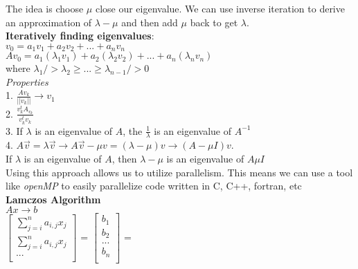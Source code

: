 \documentclass[12pt, AMS Euler]{article}
\begin{document}
The idea is choose $\mu$ close our eigenvalue. We can use inverse iteration to derive an approximation of $\lambda - \mu$ and then add $\mu$ back to get $\lambda$.\\

\textbf{Iteratively finding eigenvalues}:\\

$v_0 = a_1 v_1 + a_2 v_2 + ... + a_n v_n$\\

$Av_0 = a_1(\lambda_1 v_1) + a_2 (\lambda_2 v_2) + ... + a_n (\lambda_n v_n)$\\

where $\lambda_1 /> \lambda_2 \geq ... \geq \lambda_{n-1} /> 0$\\


\textit{Properties}\\

1. $\frac{Av_k}{||v_k||} \rightarrow v_1$\\

2. $\frac{v_k^t A_{v_k}}{v_k^t v_k}$\\


3. If $\lambda$ is an eigenvalue of $A$, the $\frac{1}{\lambda}$ is an eigenvalue of $A^{-1}$ \\

4. $A \vec{v} = \lambda \vec{v} \rightarrow A \vec{v} - \mu v = (\lambda - \mu) v \rightarrow (A - \mu I) v$.\\
\quad If $\lambda$ is an eigenvalue of $A$, then $\lambda - \mu$ is an eigenvalue of $A \mu I$\\

Using this approach allows us to utilize parallelism. This means we can use a tool like \textit{openMP} to easily parallelize code written in C, C++, fortran, etc\\

\textbf{Lamczos Algorithm}\\

$Ax \rightarrow b$\\
$
\begin{bmatrix}
	\sum_{j=i}^n a_{i,j} x_j\\
	\sum_{j=i}^n a_{i,j} x_j\\
	...\\
\end{bmatrix}
$
=
$
\begin{bmatrix}
	b_{1}\\
	b_{2}\\
	...\\
	b_{n}\\
\end{bmatrix}
$
=\\
\end{document}
